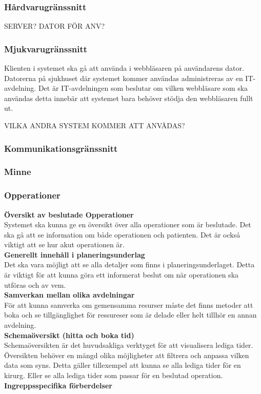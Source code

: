 \documentclass{article}
\begin{document}
\begin{enumerate}
\subsubsection{Hårdvarugränssnitt}
\label{subsec:Hardvarugranssnitt}
SERVER? DATOR FÖR ANV?
\subsubsection{Mjukvarugränssnitt}
\label{subsec:Mjukvarugranssnitt}
Klienten i systemet ska gå att använda i webbläsaren på användarens dator.
Datorerna på sjukhuset där systemet kommer användas administreras av en
IT-avdelning. Det är IT-avdelningen som beslutar om vilken webbläsare som ska
användas detta innebär att systemet bara behöver stödja den webbläsaren fullt
ut.

VILKA ANDRA SYSTEM KOMMER ATT ANVÄDAS?
\subsubsection{Kommunikationsgränssnitt}
\label{subsec:Kommunikationsgranssnitt}
\subsubsection{Minne}
\label{subsec:Minne}
\subsubsection{Opperationer}
\label{subsec:Opperationer}
\textbf{Översikt av beslutade Opperationer}\\
Systemet ska kunna ge en översikt över alla operationer som är beslutade.
Det ska gå att se information om både operationen och patienten. Det är också
viktigt att se hur akut operationen är.\\
\textbf{Generellt innehåll i planeringsunderlag}\\
Det ska vara möjligt att se alla detaljer som finns i planeringsunderlaget.
Detta är viktigt för att kunna göra ett informerat beslut om när operationen ska
utföras och av vem.\\
\textbf{Samverkan mellan olika avdelningar}\\
För att kunna samverka om gemensamma resurser måste det finns metoder att boka
och se tillgänglighet för ressureser som är delade eller helt tillhör en annan
avdelning.\\
\textbf{Schemaöversikt (hitta och boka tid)}\\
Schemaöversikten är det huvudsakliga verktyget för att visualisera lediga tider.
Översikten behöver en mängd olika möjligheter att filtrera och anpassa vilken
data som syns. Detta gäller tillexempel att kunna se alla lediga tider för en
kirurg. Eller se alla lediga tider som passar för en beslutad operation.\\
\textbf{Ingreppsspecifika förberdelser}\\


\end{enumerate}
\end{document}
